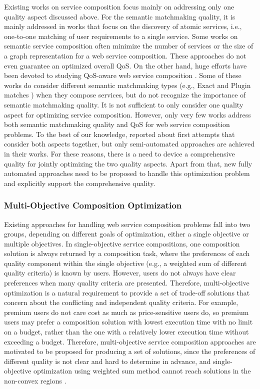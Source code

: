 Existing works on service composition focus mainly on addressing only one quality aspect discussed above. For the semantic matchmaking quality, it is mainly addressed in works that focus on the discovery of atomic services, i.e., one-to-one matching of user requirements to a single service. Some works \cite{bansal2016generalized,boustil2014semantic,mier2015integrated} on semantic service composition often minimize the number of services or the size of a graph representation for a web service composition. These approaches do not even guarantee an optimized overall QoS. On the other hand, huge efforts have been devoted to studying QoS-aware web service composition \cite{da2015graphevol,da2016particle,gupta2015optimization,ma2015hybrid,qi2010combining,yu2013adaptive}. Some of these works do consider different semantic matchmaking types (e.g., Exact and Plugin matches \cite{paolucci2002semantic}) when they compose services, but do not recognize the importance of semantic matchmaking quality. It is not sufficient to only consider one quality aspect for optimizing service composition. However, only very few works address both semantic matchmaking quality and QoS for web service composition problems. To the best of our knowledge, \cite{fanjiang2014semantic,lecue2009optimizing,pop2009immune} reported about first attempts that consider both aspects together, but only semi-automated approaches are achieved in their works. For these reasons, there is a need to device a comprehensive quality for jointly optimizing the two quality aspects. Apart from that, new fully automated approaches need to be proposed to handle this optimization problem and explicitly support the comprehensive quality. 


\subsubsection{Multi-Objective Composition Optimization}
Existing approaches for handling web service composition problems fall into two groups, depending on different goals of optimization, either a single objective or multiple objectives. In single-objective service compositions, one composition solution is always returned by a composition task, where the preferences of each quality component within the single objective (e.g., a weighted sum of different quality criteria) is known by users. However, users do not always have clear preferences when many quality criteria are presented. Therefore, multi-objective optimization is a natural requirement to provide a set of trade-off solutions that concern about the conflicting and independent quality criteria. For example, premium users do not care cost as much as price-sensitive users do, so premium users may prefer a composition solution with lowest execution time with no limit on a budget, rather than the one with a relatively lower execution time without exceeding a budget. Therefore, multi-objective service composition approaches are motivated to be proposed for producing a set of solutions, since the preferences of different quality is not clear and hard to determine in advance, and single-objective optimization using weighted sum method cannot reach solutions in the non-convex regions \cite{kim2006adaptive}.  

